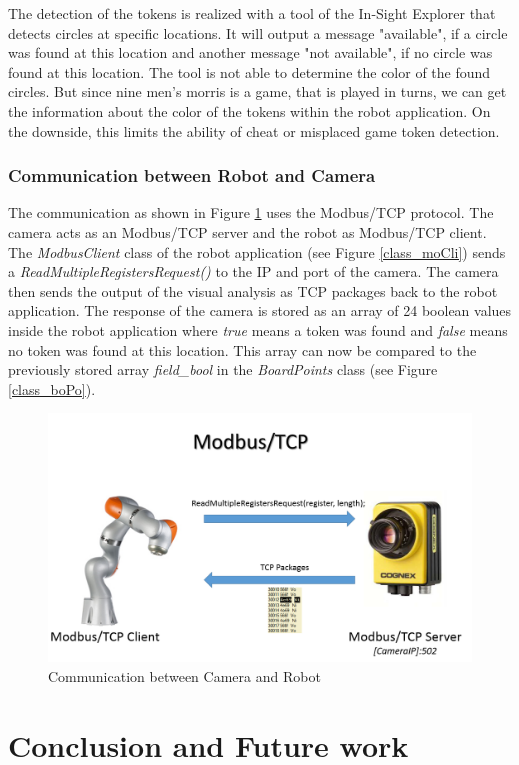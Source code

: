 \documentclass[a4paper]{spie}  %
\begin{document}
\begin{large}
The detection of the tokens is realized with a tool of the In-Sight Explorer that detects circles at specific locations. It will output a message "available", if a circle was found at this location and another message "not available", if no circle was found at this location. The tool is not able to determine the color of the found circles. But since nine men's  morris is a game, that is played in turns, we can get the information about the color of the tokens within the robot application. On the downside, this limits the ability of cheat or misplaced game token detection.


\subsubsection{Communication between Robot and Camera}
\label{commu}
The communication as shown in Figure \ref{communication} uses the Modbus/TCP protocol. The camera acts as an Modbus/TCP server and the robot as Modbus/TCP client. The \emph{ModbusClient} class of the robot application (see Figure \ref{class_moCli})  sends a \emph{ReadMultipleRegistersRequest()} to the IP and port of the camera. The camera then sends the output of the visual analysis as TCP packages back to the robot application. The response of the camera is stored as an array of 24 boolean values inside the robot application where \emph{true} means a token was found and \emph{false} means no token was found at this location. This array can now be compared to the previously stored array \emph{field\_bool} in the \emph{BoardPoints} class (see Figure \ref{class_boPo}).
\begin{figure}[h]
\includegraphics[width=15cm]{images/communication.png}
\centering
\caption{Communication between Camera and Robot}
\label{communication}
\end{figure}


\section{Conclusion and Future work}
\end{large}
\newpage


\end{document}
